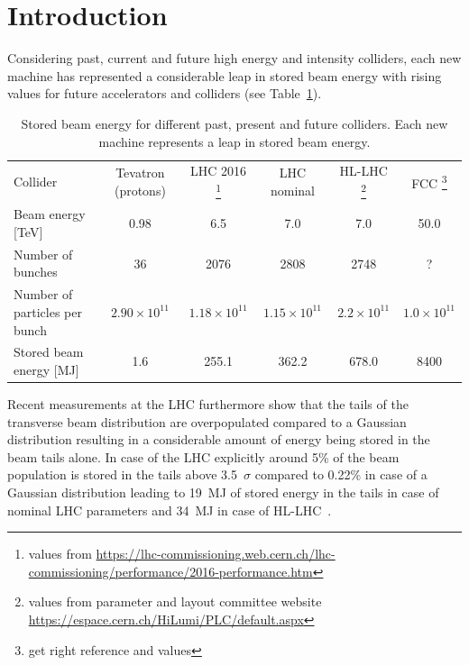 \documentclass[%
 reprint,
 amsmath,amssymb,
 aps,
prstab,
]{revtex4-1}
\begin{document}

\section{\label{sec:intro}Introduction}%
Considering past, current and future high energy and intensity colliders, each new machine has represented a considerable leap in stored beam energy with rising values for future accelerators and colliders (see Table~\ref{tab:stored_energy}). 
\begin{table}
	\caption{\label{tab:stored_energy}%
		Stored beam energy for different past, present and future colliders. Each new machine represents a leap in stored beam energy.
	}
	\begin{ruledtabular}
		\begin{tabular}{lccccc}
			Collider& Tevatron (protons) \cite{tevatron} & LHC 2016 \cite{} \footnote{values from \url{https://lhc-commissioning.web.cern.ch/lhc-commissioning/performance/2016-performance.htm}}& LHC nominal \cite{lhc_design} & HL-LHC \cite{} \footnote{values from parameter and layout committee website \url{https://espace.cern.ch/HiLumi/PLC/default.aspx}}& FCC \cite{fcc_param_2017} \footnote{get right reference and values}\\
			\colrule
			Beam energy [TeV] & 0.98 & 6.5 & 7.0 & 7.0 & 50.0\\
			Number of bunches & 36 & 2076 & 2808 & 2748 & ? \\
			Number of particles per bunch & $2.90\times 10^{11}$ & $1.18\times 10^{11}$ & $1.15\times 10^{11}$ & $2.2\times 10^{11}$ & $1.0\times 10^{11}$\\
			Stored beam energy [MJ] & 1.6 & 255.1 & 362.2 & 678.0 & 8400 \\
		\end{tabular}
	\end{ruledtabular}
\end{table}
Recent measurements at the LHC furthermore show that the tails of the transverse beam distribution are overpopulated compared to a Gaussian distribution resulting in a considerable amount of energy being stored in the beam tails alone. In case of the LHC explicitly around 5\% of the beam population is stored in the tails above 3.5~$\sigma$ compared to 0.22\% in case of a Gaussian distribution leading to 19~MJ of stored energy in the tails in case of nominal LHC parameters and 34~MJ in case of HL-LHC~\cite{helreview_valentino}.
\end{document}
